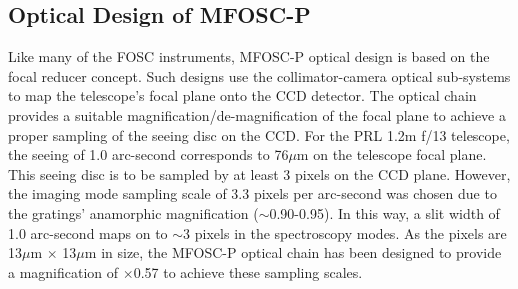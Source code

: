 \par
\subsection{Optical Design of MFOSC-P} 
\label{subsec-OpticalDesign}
\par

Like many of the FOSC instruments, MFOSC-P optical design is based on the focal reducer concept. Such designs use the collimator-camera optical sub-systems to map the telescope's focal plane onto the CCD detector. The optical chain provides a suitable magnification/de-magnification of the focal plane to achieve a proper sampling of the seeing disc on the CCD. For the PRL 1.2m f/13 telescope, the seeing of 1.0 arc-second corresponds to 76$\mu$m on the telescope focal plane. This seeing disc is to be sampled by at least 3 pixels on the CCD plane. However, the imaging mode sampling scale of 3.3 pixels per arc-second was chosen due to the gratings' anamorphic magnification ($\sim$0.90-0.95)\citep{Schweizer1979}. In this way, a slit width of 1.0 arc-second maps on to $\sim$3 pixels in the spectroscopy modes. As the pixels are 13$\mu$m $\times$ 13$\mu$m in size, the MFOSC-P optical chain has been designed to provide a magnification of $\times$0.57 to achieve these sampling scales.

